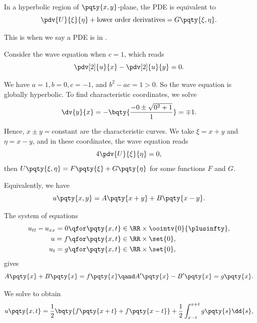 In a hyperbolic region of \(\pqty{x, y}\)-plane, the PDE is equivalent to
\begin{equation}
    \pdv{U}{\xi}{\eta} + \text{lower order derivatives} = G\pqty{\xi, \eta}.
\end{equation}

This is when we say a PDE is in .

\begin{example}
    Consider the wave equation when \(c = 1\), which reads
    \begin{equation}
        \pdv[2]{u}{x} - \pdv[2]{u}{y} = 0.
    \end{equation}

    We have \(a = 1, b = 0, c = -1\), and \(b^2 - ac = 1 > 0\). So the wave equation is globally hyperbolic. To find characteristic coordinates, we solve
    \begin{equation}
        \dv{y}{x} = - \bqty{\frac{-0 \pm \sqrt{0^2 + 1}}{1}} = \mp 1.
    \end{equation}

    Hence, \(x \pm y = \text{constant}\) are the characteristic curves. We take \(\xi = x + y\) and \(\eta = x - y\), and in these coordinates, the wave equation reads
    \begin{equation}
        4 \pdv{U}{\xi}{\eta} = 0,
    \end{equation}
    then \(U\pqty{\xi, \eta} = F\pqty{\xi} + G\pqty{\eta}\) for some functions \(F\) and \(G\).

    Equivalently, we have
    \begin{equation}
        u\pqty{x, y} = A \pqty{x + y} + B \pqty{x - y}.
    \end{equation}

    The system of equations
    \begin{subequations}
        \begin{align}
            u_{tt} - u_{xx} = 0 &\qfor \pqty{x, t} \in \RR \times \oointv{0}{\plusinfty}, \\
            u = f &\qfor \pqty{x, t} \in \RR \times \set{0}, \\
            u_t = g &\qfor \pqty{x, t} \in \RR \times \set{0},
        \end{align}
    \end{subequations}
    gives
    \begin{equation}
        A\pqty{x} + B\pqty{x} = f\pqty{x} \qand A'\pqty{x} - B'\pqty{x} = g\pqty{x}.
    \end{equation}

    We solve to obtain
    \begin{equation}
        u\pqty{x, t} = \frac{1}{2} \bqty{f\pqty{x + t} + f\pqty{x - t}} + \frac{1}{2} \int_{x - t}^{x + t} g\pqty{s} \dd{s},
    \end{equation}
\end{example}


